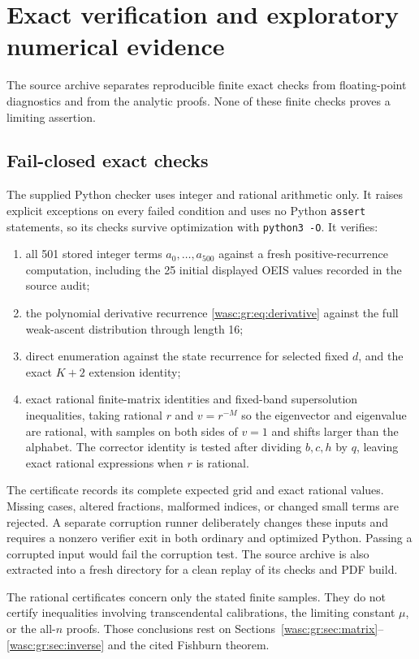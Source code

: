 \documentclass[11pt,a4paper]{article}
\theoremstyle{remark}\newtheorem{remark}[theorem]{Remark}
\numberwithin{equation}{section}
\begin{document}
\section{Exact verification and exploratory numerical evidence}\label{wasc:gr:sec:verification}
The source archive separates reproducible finite exact checks from floating-point diagnostics and from the analytic proofs. None of these finite checks proves a limiting assertion.

\subsection{Fail-closed exact checks}
The supplied Python checker uses integer and rational arithmetic only. It raises explicit exceptions on every failed condition and uses no Python \texttt{assert} statements, so its checks survive optimization with \texttt{python3 -O}. It verifies:
\begin{enumerate}[leftmargin=*,itemsep=3pt]
\item all 501 stored integer terms $a_0,\ldots,a_{500}$ against a fresh positive-recurrence computation, including the 25 initial displayed OEIS values recorded in the source audit;
\item the polynomial derivative recurrence \eqref{wasc:gr:eq:derivative} against the full weak-ascent distribution through length 16;
\item direct enumeration against the state recurrence for selected fixed $d$, and the exact $K+2$ extension identity;
\item exact rational finite-matrix identities and fixed-band supersolution inequalities, taking rational $r$ and $v=r^{-M}$ so the eigenvector and eigenvalue are rational, with samples on both sides of $v=1$ and shifts larger than the alphabet. The corrector identity is tested after dividing $b,c,h$ by $q$, leaving exact rational expressions when $r$ is rational.
\end{enumerate}
The certificate records its complete expected grid and exact rational values. Missing cases, altered fractions, malformed indices, or changed small terms are rejected. A separate corruption runner deliberately changes these inputs and requires a nonzero verifier exit in both ordinary and optimized Python. Passing a corrupted input would fail the corruption test. The source archive is also extracted into a fresh directory for a clean replay of its checks and PDF build.

The rational certificates concern only the stated finite samples. They do not certify inequalities involving transcendental calibrations, the limiting constant $\mu$, or the all-$n$ proofs. Those conclusions rest on Sections~\ref{wasc:gr:sec:matrix}--\ref{wasc:gr:sec:inverse} and the cited Fishburn theorem.
\end{document}
